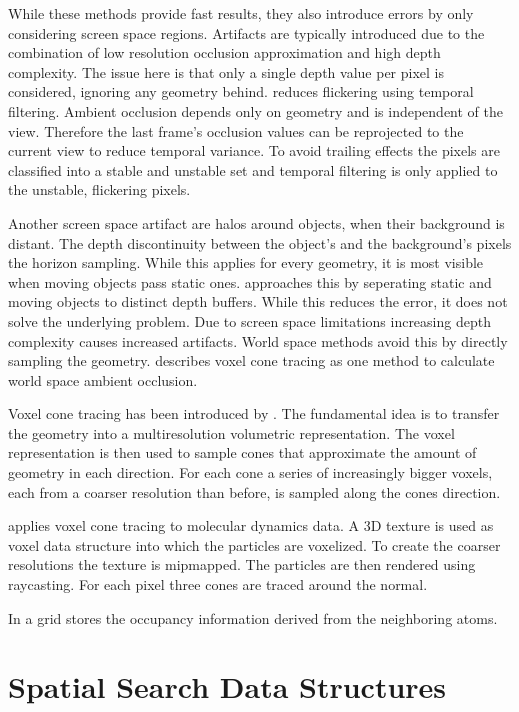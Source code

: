 \documentclass[hyperref,german,diplominf]{cgvpub}
\begin{document}
While these methods provide fast results, they also introduce errors by only considering screen space regions. Artifacts are typically introduced due to the combination of low resolution occlusion approximation and high depth complexity. The issue here is that only a single depth value per pixel is considered, ignoring any geometry behind. \cite{31} reduces flickering using temporal filtering. Ambient occlusion depends only on geometry and is independent of the view. Therefore the last frame's occlusion values can be reprojected to the current view to reduce temporal variance. To avoid trailing effects the pixels are classified into a stable and unstable set and temporal filtering is only applied to the unstable, flickering pixels. 

Another screen space artifact are halos around objects, when their background is distant. The depth discontinuity between the object's and the background's pixels the horizon sampling. While this applies for every geometry, it is most visible when moving objects pass static ones. \cite{32} approaches this by seperating static and moving objects to distinct depth buffers. While this reduces the error, it does not solve the underlying problem. Due to screen space limitations increasing depth complexity causes increased artifacts. World space methods avoid this by directly sampling the geometry. \cite{32} describes voxel cone tracing as one method to calculate world space ambient occlusion. 

Voxel cone tracing has been introduced by \cite{23}. The fundamental idea is to transfer the geometry into a multiresolution volumetric representation. The voxel representation is then used to sample cones that approximate the amount of geometry in each direction. For each cone a series of increasingly bigger voxels, each from a coarser resolution than before, is sampled along the cones direction.

\cite{10} applies voxel cone tracing to molecular dynamics data. A 3D texture is used as voxel data structure into which the particles are voxelized. To create the coarser resolutions the texture is mipmapped. The particles are then rendered using raycasting. For each pixel three cones are traced around the normal.

In \cite{9} a grid stores the occupancy information derived from the neighboring atoms.

\section{Spatial Search Data Structures}
\end{document}
